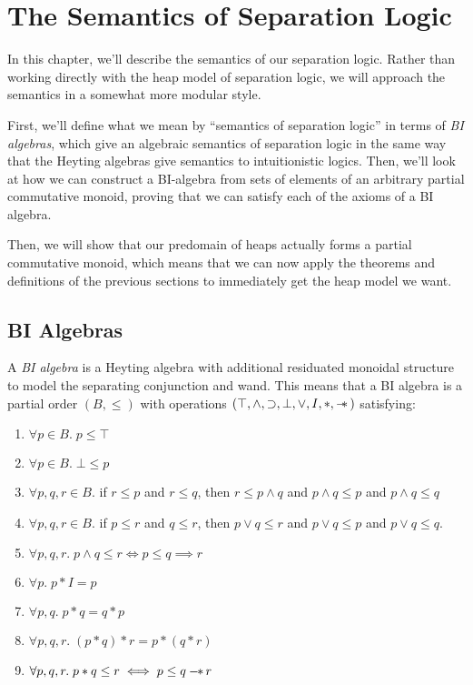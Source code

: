\chapter{The Semantics of Separation Logic}

In this chapter, we'll describe the semantics of our separation logic.
Rather than working directly with the heap model of separation logic,
we will approach the semantics in a somewhat more modular
style. 

First, we'll define what we mean by ``semantics of separation logic''
in terms of \emph{BI algebras}, which give an algebraic semantics of
separation logic in the same way that the Heyting algebras give
semantics to intuitionistic logics. Then, we'll look at how we can
construct a BI-algebra from sets of elements of an arbitrary partial
commutative monoid, proving that we can satisfy each of the axioms of
a BI algebra.

Then, we will show that our predomain of heaps actually forms a
partial commutative monoid, which means that we can now apply the
theorems and definitions of the previous sections to immediately get
the heap model we want.


\section{BI Algebras}

A \emph{BI algebra} is a Heyting algebra with additional residuated
monoidal structure to model the separating conjunction and wand. This
means that a BI algebra is a partial order $(B, \leq)$ with operations
$(\top, \land, \supset, \bot, \vee, I, *, -\!\!*\,)$ satisfying:

\begin{enumerate}
\item $\forall p \in B.\; p \leq \top$
\item $\forall p \in B.\; \bot \leq p$
\item $\forall p,q,r \in B.$ if $r \leq p$ and $r \leq q$, then
      $r \leq p \land q$ and 
      $p \land q \leq p$ and $p \land q \leq q$
\item $\forall p,q,r \in B.$ if $p \leq r$ and $q \leq r$, then
      $p \vee q \leq r$ and
      $p \vee q \leq p$ and $p \vee q \leq q$.
\item $\forall p, q, r.\; p \land q \leq r \iff p \leq q \implies r$
\item $\forall p.\; p * I = p$
\item $\forall p, q.\; p * q = q * p$
\item $\forall p, q, r.\; (p * q) * r = p * (q * r)$
\item $\forall p, q, r.\; p * q \leq r \iff p \leq q -\!\!*\, r$
\end{enumerate}

